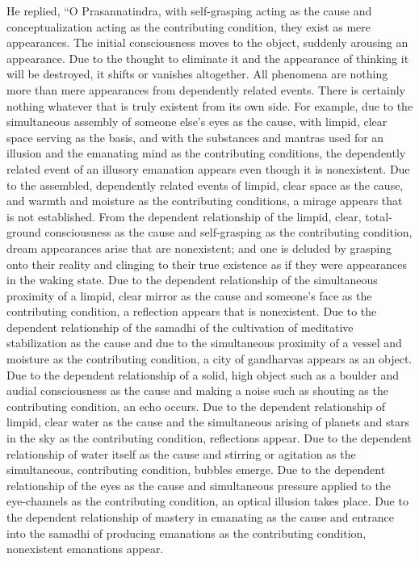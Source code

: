\documentclass[a4paper,11pt,twoside,final]{book}
\begin{document}
He replied, ``O Prasannatindra, with self-grasping acting as the cause
and conceptualization acting as the contributing condition, they exist
as mere appearances. The initial consciousness moves to the object,
suddenly arousing an appearance. Due to the thought to eliminate it
and the appearance of thinking it will be destroyed, it shifts or
vanishes altogether. All phenomena are nothing more than mere
appearances from dependently related events. There is certainly
nothing whatever that is truly existent from its own side.  For
example, due to the simultaneous assembly of someone else's eyes as
the cause, with limpid, clear space serving as the basis, and with the
substances and mantras used for an illusion and the emanating mind as
the contributing conditions, the dependently related event of an
illusory emanation appears even though it is nonexistent. Due to the
assembled, dependently related events of limpid, clear space as the
cause, and warmth and moisture as the contributing conditions, a
mirage appears that is not established. From the dependent
relationship of the limpid, clear, total-ground consciousness as the
cause and self-grasping as the contributing condition, dream
appearances arise that are nonexistent; and one is deluded by grasping
onto their reality and clinging to their true existence as if they
were appearances in the waking state. Due to the dependent
relationship of the simultaneous proximity of a limpid, clear mirror
as the cause and someone's face as the contributing condition, a
reflection appears that is nonexistent. Due to the dependent
relationship of the samadhi of the cultivation of meditative
stabilization as the cause and due to the simultaneous proximity of a
vessel and moisture as the contributing condition, a city of
gandharvas appears as an object. Due to the dependent relationship of
a solid, high object such as a boulder and audial consciousness as the
cause and making a noise such as shouting as the contributing
condition, an echo occurs. Due to the dependent relationship of
limpid, clear water as the cause and the simultaneous arising of
planets and stars in the sky as the contributing condition,
reflections appear. Due to the dependent relationship of water itself
as the cause and stirring or agitation as the simultaneous,
contributing condition, bubbles emerge. Due to the dependent
relationship of the eyes as the cause and simultaneous pressure
applied to the eye-channels as the contributing condition, an optical
illusion takes place. Due to the dependent relationship of mastery in
emanating as the cause and entrance into the samadhi of producing
emanations as the contributing condition, nonexistent emanations
appear.
\end{document}
